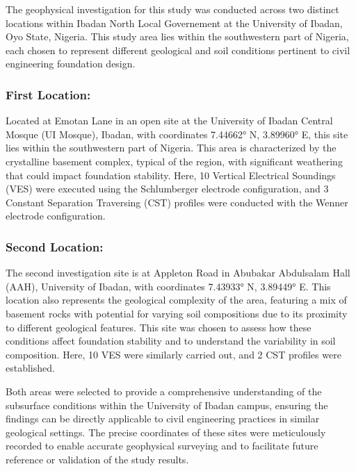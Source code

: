 \documentclass[12pt,a4paper]{report}
\begin{document}
The geophysical investigation for this study was conducted across two distinct locations within Ibadan North Local Governement at the University of Ibadan, Oyo State, Nigeria. This study area lies within the southwestern part of Nigeria, each chosen to represent different geological and soil conditions pertinent to civil engineering foundation design.

\subsubsection{\textbf{First Location:}}
Located at Emotan Lane in an open site at the University of Ibadan Central Mosque (UI Mosque), Ibadan, with coordinates 7.44662° N, 3.89960° E, this site lies within the southwestern part of Nigeria. This area is characterized by the crystalline basement complex, typical of the region, with significant weathering that could impact foundation stability. Here, 10 Vertical Electrical Soundings (VES) were executed using the Schlumberger electrode configuration, and 3 Constant Separation Traversing (CST) profiles were conducted with the Wenner electrode configuration.

\subsubsection{\textbf{Second Location:}}
The second investigation site is at Appleton Road in Abubakar Abdulsalam Hall (AAH), University of Ibadan, with coordinates 7.43933° N, 3.89449° E. This location also represents the geological complexity of the area, featuring a mix of basement rocks with potential for varying soil compositions due to its proximity to different geological features. This site was chosen to assess how these conditions affect foundation stability and to understand the variability in soil composition. Here, 10 VES were similarly carried out, and 2 CST profiles were established.

Both areas were selected to provide a comprehensive understanding of the subsurface conditions within the University of Ibadan campus, ensuring the findings can be directly applicable to civil engineering practices in similar geological settings. The precise coordinates of these sites were meticulously recorded to enable accurate geophysical surveying and to facilitate future reference or validation of the study results.
\end{document}
